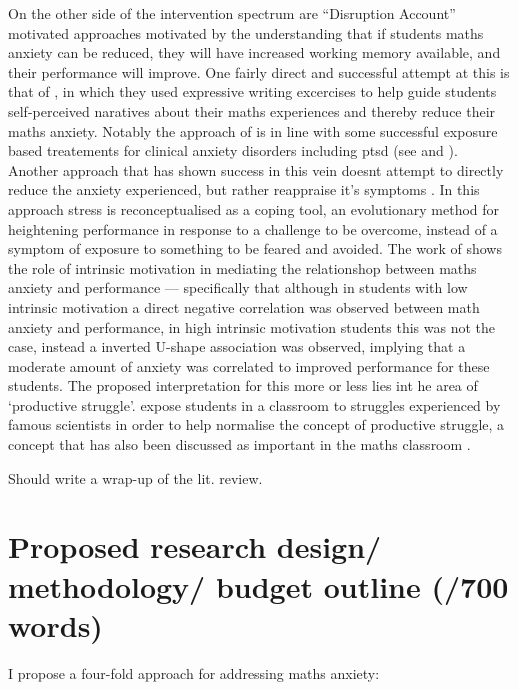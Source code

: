 \documentclass[14pt]{memoir}
\begin{document}
On the other side of the intervention spectrum are ``Disruption Account'' motivated approaches motivated by the understanding that if students maths anxiety can be reduced, they will have increased working memory available, and their performance will improve. One fairly direct and successful attempt at this is that of , in which they used expressive writing excercises to help guide students self-perceived naratives about their maths experiences and thereby reduce their maths anxiety. Notably the approach of  is in line with some successful exposure based treatements for clinical anxiety disorders including \gls{ptsd} (see  and ). Another approach that has shown success in this vein doesnt attempt to directly reduce the anxiety experienced, but rather reappraise it's symptoms \cite{Jamieson2016}. In this approach stress is reconceptualised as a coping tool, an evolutionary method for heightening performance in response to a challenge to be overcome, instead of a symptom of exposure to something to be feared and avoided. The work of \cite{Wang2015} shows the role of intrinsic motivation in mediating the relationshop between maths anxiety and performance --- specifically that although in students with low intrinsic motivation a direct negative correlation was observed between math anxiety and performance, in high intrinsic motivation students this was not the case, instead a inverted U-shape association was observed, implying that a moderate amount of anxiety was correlated to improved performance for these students. The proposed interpretation for this more or less lies int he area of `productive struggle'.  expose students in a classroom to struggles experienced by famous scientists in order to help normalise the concept of productive struggle, a concept that has also been discussed as important in the maths classroom \cite{Hiebert2007}.
 
Should write a wrap-up of the lit. review.


\section{Proposed research design/ methodology/ budget outline (/700 words)}

I propose a four-fold approach for addressing maths anxiety:
\end{document}
